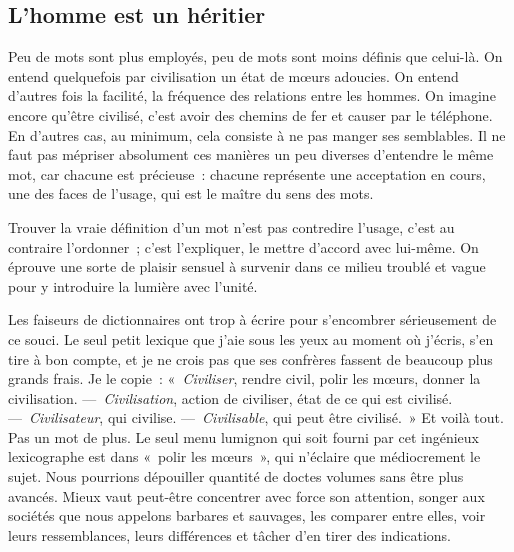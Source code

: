 \documentclass[french,twoside]{book} %
\newcommand{\astermono}{\medskip\centerline{\color{rubric}\large\selectfont{\syms ✻}}\medskip\par}%
\begin{document}
\subsection[L’homme est un héritier]{L’homme est un héritier}
\noindent Peu de mots sont plus employés, peu de mots sont moins définis que celui-là. On entend quelquefois par civilisation un état de mœurs adoucies. On entend d’autres fois la facilité, la fréquence des relations entre les hommes. On imagine encore qu’être civilisé, c’est avoir des chemins de fer et causer par le téléphone. En d’autres cas, au minimum, cela consiste à ne pas manger ses semblables. Il ne faut pas mépriser absolument ces manières un peu diverses d’entendre le même mot, car chacune est précieuse : chacune représente une acceptation en cours, une des faces de l’usage, qui est le maître du sens des mots.\par
Trouver la vraie définition d’un mot n’est pas contredire l’usage, c’est au contraire l’ordonner ; c’est l’expliquer, le mettre d’accord avec lui-même. On éprouve une sorte de plaisir sensuel à survenir dans ce milieu troublé et vague pour y introduire la lumière avec l’unité.\par
Les faiseurs de dictionnaires ont trop à écrire pour s’encombrer sérieusement de ce souci. Le seul petit lexique que j’aie sous les yeux au moment où j’écris, s’en tire à bon compte, et je ne crois pas que ses confrères fassent de beaucoup plus grands frais. Je le copie : «\emph{ Civiliser}, rendre civil, polir les mœurs, donner la civilisation. — \emph{Civilisation}, action de civiliser, état de ce qui est civilisé. — \emph{Civilisateur}, qui civilise. — \emph{Civilisable}, qui peut être civilisé. » Et voilà tout. Pas un mot de plus. Le seul menu lumignon qui soit fourni par cet ingénieux lexicographe est dans « polir les mœurs », qui n’éclaire que médiocrement le sujet. Nous pourrions dépouiller quantité de doctes volumes sans être plus avancés. Mieux vaut peut-être concentrer avec force son attention, songer aux sociétés que nous appelons barbares et sauvages, les comparer entre elles, voir leurs ressemblances, leurs différences et tâcher d’en tirer des indications.\par

\astermono
\end{document}
